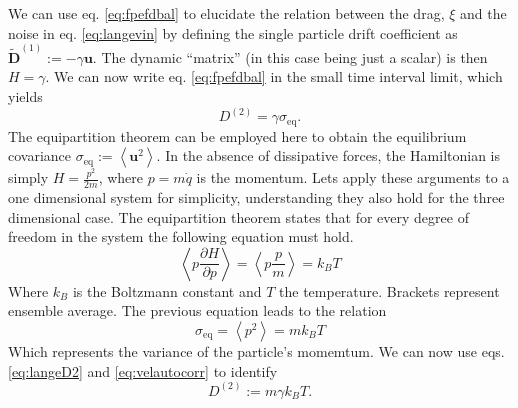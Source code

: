 \documentclass[ twoside,openright,titlepage,numbers=noenddot,%
headinclude,footinclude,cleardoublepage=empty,abstract=on,
BCOR=5mm,paper=a4,fontsize=11pt, dvipsnames
]{scrreprt}
\renewcommand{\vec}[1]{\bm{#1}}
\newcommand{\kT}{k_B T}
\newcommand{\ppos}{q}
\newcommand{\pvel}{u}
\begin{document}
We can use eq. \eqref{eq:fpefdbal} to elucidate the relation between the drag, $\xi$ and the noise in eq. \eqref{eq:langevin} by defining the single particle drift coefficient as $\widetilde{\vec{D}}^{(1)} := -\gamma \vec{\pvel}$. The dynamic ``matrix'' (in this case being just a scalar) is then $H = \gamma$. We can now write eq. \eqref{eq:fpefdbal} in the small time interval limit, which yields
\begin{equation}
  \label{eq:langeD2}
  D^{(2)} = \gamma\sigma_{\text{eq}}.
\end{equation}
The equipartition theorem can be employed here to obtain the equilibrium covariance $\sigma_{\text{eq}} := \left\langle\vec{\pvel}^2\right\rangle$.
In the absence of dissipative forces, the Hamiltonian is simply $H = \frac{p^2}{2m}$, where $p = m\dot{\ppos}$ is the momentum.
Lets apply these arguments to a one dimensional system for simplicity, understanding they also hold for the three dimensional case. The equipartition theorem states that for every degree of freedom in the system the following equation must hold.
\begin{equation}
  \left\langle p \frac{\partial H}{\partial p}\right\rangle = \left\langle p \frac{p}{m}\right\rangle = k_BT
\end{equation}
Where $k_B$ is the Boltzmann constant and $T$ the temperature. Brackets represent ensemble average.
The previous equation leads to the relation
\begin{equation}
  \label{eq:velautocorr}
  \sigma_{\text{eq}} = \left\langle p^2\right\rangle = m k_BT
\end{equation}
Which represents the variance of the particle's momemtum. We can now use eqs. \eqref{eq:langeD2} and \eqref{eq:velautocorr} to identify
\begin{equation}
  \label{eq:langenoiseamp}
  D^{(2)} := m\gamma\kT.
\end{equation}
\end{document}
